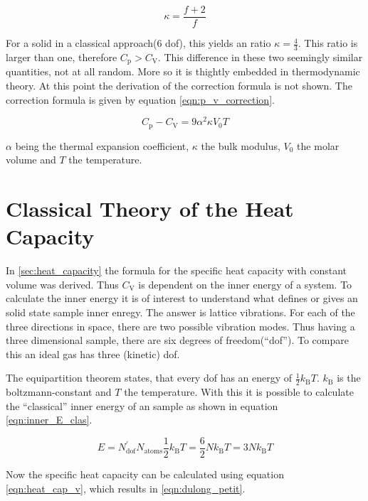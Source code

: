 \begin{equation}
    \label{eqn:isentropic_const_dof}
    \kappa = \frac{f+2}{f}
\end{equation}

For a solid in a classical approach(6 dof), this yields an ratio $\kappa = \frac{4}{3}$. This ratio is larger than one, therefore $C_\mathrm{p} > C_\mathrm{V}$.
This difference in these two seemingly similar quantities, not at all random. More so it is thightly embedded in thermodynamic theory. At this point the derivation of the correction 
formula is not shown. The correction formula is given by equation \ref{eqn:p_v_correction}.

\begin{equation}
    \label{eqn:p_v_correction}
    C_\mathrm{p} - C_\mathrm{V} = 9\alpha^2\kappa V_0T
\end{equation}

$\alpha$ being the thermal expansion coefficient, $\kappa$ the bulk modulus, $V_0$ the molar volume and $T$ the temperature.

\section{Classical Theory of the Heat Capacity}
\label{sec:classical}
In \autoref{sec:heat_capacity} the formula for the specific heat capacity with constant volume was derived. Thus $C_\mathrm{V}$ is dependent on the inner energy of a system. To 
calculate the inner energy it is of interest to understand what defines or gives an solid state sample inner enregy. The answer is lattice vibrations. For each of the three directions
in space, there are two possible vibration modes. Thus having a three dimensional sample, there are six degrees of freedom(\enquote{dof}). To compare this an ideal gas has three (kinetic)
dof.

The equipartition theorem states, that every
dof has an energy of $\frac{1}{2}k_\mathrm{B}T$. $k_\mathrm{B}$ is the boltzmann-constant and $T$ the temperature. With this it is possible to calculate the \enquote{classical} inner
energy of an sample as shown in equation \ref{eqn:inner_E_clas}.

\begin{equation}
    \label{eqn:inner_E_clas}
    E = N_{\mathrm{dof}}^{'} N_{\mathrm{atoms}} \frac{1}{2}k_\mathrm{B}T = \frac{6}{2}Nk_\mathrm{B}T = 3Nk_\mathrm{B}T
\end{equation}

Now the specific heat capacity can be calculated using equation \ref{eqn:heat_cap_v}, which results in \ref{eqn:dulong_petit}.

